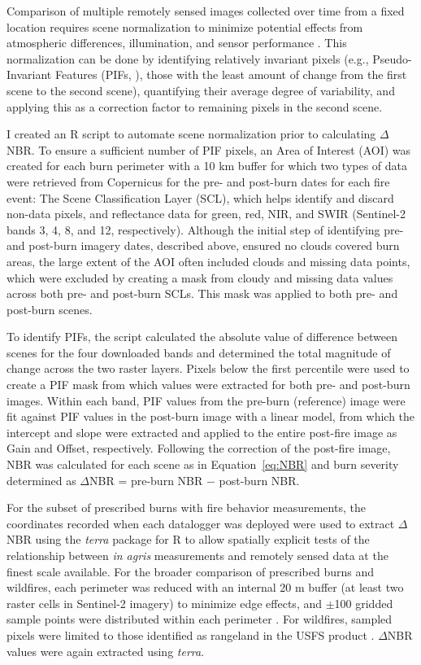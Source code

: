 \documentclass[fire,article,accept,oneauthor,pdftex]{Definitions/mdpi}
\begin{document}
Comparison of multiple remotely sensed images collected over time from a fixed location requires scene normalization to minimize potential effects from atmospheric differences, illumination, and sensor performance \cite{key2006a, schott1988}. 
This normalization can be done by identifying relatively invariant pixels ({e.g.}, Pseudo-Invariant Features (PIFs,  \cite{schott1988}), those with the least amount of change from the first scene to the second scene), quantifying their average degree of variability, and applying this as a correction factor to remaining pixels in the second scene. 

I created an R script to automate scene normalization prior to calculating $\Delta$NBR. 
To ensure a sufficient number of PIF pixels, an Area of Interest (AOI) was created for each burn perimeter with a 10 km buffer for which two types of data were retrieved from Copernicus for the pre- and post-burn dates for each fire event: The Scene Classification Layer (SCL), which helps identify and discard non-data pixels, and reflectance data for green, red, NIR, and SWIR (Sentinel-2 bands 3, 4, 8, and 12, respectively).
Although the initial step of identifying pre- and post-burn imagery dates, described above, ensured no clouds covered burn areas, the large extent of the AOI often included clouds and missing data points, which were excluded by creating a mask from cloudy and missing data values across both pre- and post-burn SCLs. 
This mask was applied to both pre- and post-burn scenes. 

To identify PIFs, the script calculated the absolute value of difference between scenes for the four downloaded bands and determined the total magnitude of change across the two raster layers. 
Pixels below the first percentile were used to create a PIF mask from which values were extracted for both pre- and post-burn images. 
Within each band, PIF values from the pre-burn (reference) image were fit against PIF values in the post-burn image with a linear model, from which the intercept and slope were extracted and applied to the entire post-fire image as Gain and Offset, respectively. 
Following the correction of the post-fire image, NBR was calculated for each scene as in Equation~\eqref{eq:NBR} and burn severity determined as $\Delta$NBR = pre-burn NBR {$-$} %
 post-burn NBR.

For the subset of prescribed burns with fire behavior measurements, the coordinates recorded when each datalogger was deployed were used to extract 	$\Delta$NBR using the \emph{terra} package for \textsf{R} \cite{hijmans2022} to allow spatially explicit tests of the relationship between \emph{in agris} measurements and remotely sensed data at the finest scale available. 
For the broader comparison of prescribed burns and wildfires, each perimeter was reduced with an internal 20 m buffer (at least two raster cells in Sentinel-2 imagery) to minimize edge effects, and $\pm$100 gridded sample points were distributed within each perimeter \cite{mcgranahan2025}. 
For wildfires, sampled pixels were limited to those identified as rangeland in the USFS product \cite{usdaforestservicenodate}. 
$\Delta$NBR values were again extracted using \emph{terra}.
\end{document}

